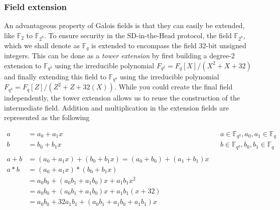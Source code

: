 \documentclass[twoside,11pt,openright]{report}
\theoremstyle{definition}
\theoremstyle{plain}
\begin{document}
\subsubsection{Field extension}

An advantageous property of Galois fields is that they can easily be extended, like $\mathbb{F}_{2}$ to $\mathbb{F}_{2^8}$. To ensure security in the SD-in-the-Head protocol, the field $\mathbb{F}_{2^8}$, which we shall denote as $\mathbb{F}_q$ is extended to encompass the field 32-bit unsigned integers. This can be done as a \textit{tower extension} by first building a degree-2 extension to $\mathbb{F}_{q^2}$ using the irreducible polynomial $F_{q^2} = F_q[X] / (X^2 + X + 32)$ and finally extending this field to $\mathbb{F}_{q^4}$ using the irreducible polynomial $F_{q^4} = F_q[Z] / (Z^2 + Z + 32(X))$. While you could create the final field independently, the tower extension allows us to reuse the construction of the intermediate field. Addition and multiplication in the extension fields are represented as the following

\begin{align*}
  a     & = a_0 + a_1x                                               &  & a \in \mathbb{F}_{q^\eta}, a_0, a_1 \in \mathbb{F}_q \\
  b     & = b_0 + b_1x                                               &  & b \in \mathbb{F}_{q^\eta}, b_0, b_1 \in \mathbb{F}_q \\\\
  a + b & = (a_0 + a_1x) + (b_0 + b_1x) = (a_0 + b_0) + (a_1 + b_1)x                                                           \\
  a * b & = (a_0 + a_1x) * (b_0 + b_1x)                                                                                        \\
        & = a_0b_0 + (a_0b_1 + a_1b_0)x + a_1b_1x^2                                                                            \\
        & = a_0b_0 + (a_0b_1 + a_1b_0)x + a_1b_1(x + 32)                                                                       \\
        & = a_0b_0 + 32a_1b_1 + (a_0b_1 + a_1b_0 + a_1b_1)x
\end{align*}
\end{document}
